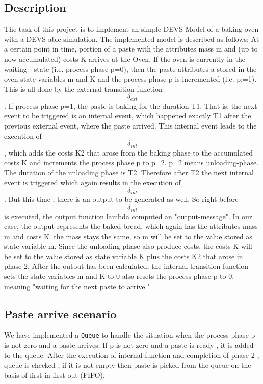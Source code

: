 \documentclass[titlepage]{article}%
\begin{document}
\subsection{Description}

The task of this project is to implement an simple DEVS-Model of a baking-oven with a DEVS-able simulation. The implemented model is described as follows;
At a certain point in time, portion of a paste with the attributes mass m and (up to now accumulated) costs K arrives at the Oven. If the oven is currently in the waiting - state (i.e. process-phase p=0), then the paste attributes a stored in the oven state variables m and K and the process-phase p is incremented (i.e. p:=1). This is all done by the external transition function $$\delta_{ext}$$ . If process phase p=1, the paste is baking for the duration T1. That is, the next event to be triggered is an internal event, which happened exactly T1 after the previous external event, where the paste arrived. This internal event leads to the execution of  $$\delta_{int}$$ , which adds the costs K2 that arose from the baking phase to the accumulated costs K and increments the process phase p to p=2. p=2 means unloading-phase. The duration of the unloading phase is T2. Therefore after T2 the next internal event is triggered which again results in the execution of $$\delta_{int}$$. But this time , there is an output to be generated as well. So right before $$\delta_{int}$$ is executed, the output function lambda computed an "output-message". In our case, the output represents the baked bread, which again has the attributes mass m and costs K. the mass stays the same, so m will be set to the value stored as state variable m. Since the unloading phase also produce costs, the costs K will be set to the value stored as state variable K plus the costs K2 that arose in phase 2. After the output has been calculated, the internal transition function sets the state variables m and K to 0 also resets the process phase p to 0, meaning "waiting for the next paste to arrive." 

\subsection{Paste arrive scenario}
We have implemented a \texttt{Queue} to handle the situation when the process phase p is not zero and a paste arrives. If p is not zero and a paste is ready , it is added to the queue. After the execution of internal function and completion of phase 2 , queue is checked , if it is not empty then paste is picked from the queue on the basis of first in first out (FIFO). 
\end{document}
